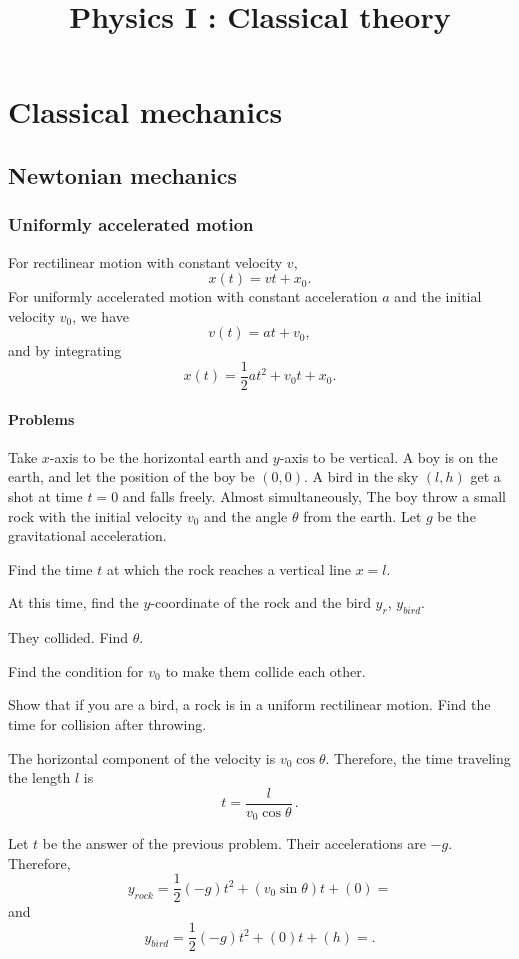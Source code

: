 \documentclass{../prb}
\title{Physics I : Classical theory}
\begin{document}
\maketitle
\tableofcontents


\chapter{Classical mechanics}


\section{Newtonian mechanics}


\subsection*{Uniformly accelerated motion}
For rectilinear motion with constant velocity $v$,
\[x(t)=vt+x_0.\]
For uniformly accelerated motion with constant acceleration $a$ and the initial velocity $v_0$, we have
\[v(t)=at+v_0,\]
and by integrating
\[x(t)=\frac12at^2+v_0t+x_0.\]

\subsubsection*{Problems}
\begin{prb}
Take $x$-axis to be the horizontal earth and $y$-axis to be vertical.
A boy is on the earth, and let the position of the boy be $(0,0)$.
A bird in the sky $(l,h)$ get a shot at time $t=0$ and falls freely.
Almost simultaneously, The boy throw a small rock with the initial velocity $v_0$ and the angle $\theta$ from the earth.
Let $g$ be the gravitational acceleration.
\begin{cond}
\item Find the time $t$ at which the rock reaches a vertical line $x=l$.
\item At this time, find the $y$-coordinate of the rock and the bird $y_r$, $y_{bird}$.
\item They collided. Find $\theta$.
\item Find the condition for $v_0$ to make them collide each other.
\item Show that if you are a bird, a rock is in a uniform rectilinear motion. Find the time for collision after throwing.
\end{cond}
\end{prb}
\begin{sol}
\item
The horizontal component of the velocity is $v_0\cos\theta$.
Therefore, the time traveling the length $l$ is
\[t=\boxed{\frac l{v_0\cos\theta}}\,.\]
\item
Let $t$ be the answer of the previous problem.
Their accelerations are $-g$.
Therefore,
\[y_{rock}=\frac12(-g)t^2+(v_0\sin\theta)t+(0)=\]
and
\[y_{bird}=\frac12(-g)t^2+(0)t+(h)=.\]

\item


\end{sol}
\end{document}
